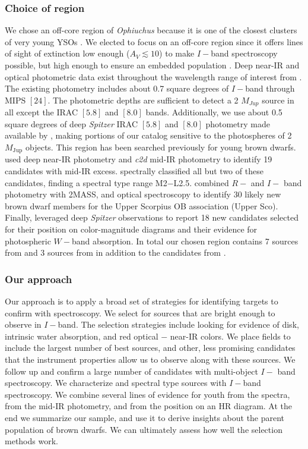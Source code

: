 \subsubsection{Choice of region}
We chose an off-core region of \emph{Ophiuchus} because it is one of the closest clusters of very young YSOs \citep{2008ApJ...675L..29L}.  We elected to focus on an off-core region since it offers lines of sight of extinction low enough ($A_V\lesssim 10$) to make $I-$band spectroscopy possible, but high enough to ensure an embedded population \citep{2008A&A...489..143L}.  Deep near-IR and optical photometric data exist throughout the wavelength range of interest from \citet{allers06}.  The existing \citet{allers06} photometry includes about 0.7 square degrees of $I-$band through MIPS $[24]$.  The photometric depths are sufficient to detect a 2 $M_{Jup}$ source in all except the IRAC $[5.8]$ and $[8.0]$ bands.  Additionally, we use about 0.5 square degrees of deep \emph{Spitzer} IRAC $[5.8]$ and $[8.0]$ photometry made available by \citet{2010ApJ...720.1374H}, making portions of our catalog sensitive to the photospheres of 2 $M_{\mathrm{Jup}}$ objects.  
This region has been searched previously for young brown dwarfs.  \citet{allers06} used deep near-IR photometry and \emph{c2d} mid-IR photometry to identify 19 candidates with mid-IR excess.  \citet{2011ASPC..448..633G} spectrally classified all but two of these candidates, finding a spectral type range M2$-$L2.5.  \citet{2006AJ....131.3016S} combined $R-$ and $I-$ band photometry with 2MASS, and optical spectroscopy to identify 30 likely new brown dwarf members for the Upper Scorpius OB association (Upper Sco).  Finally, \citet{2010ApJ...720.1374H} leveraged deep \emph{Spitzer} observations to report 18 new candidates selected for their position on color-magnitude diagrams and their evidence for photospheric $W-$band absorption.  In total our chosen region contains 7 sources from \citet{allers06} and 3 sources from \citet{2006AJ....131.3016S} in addition to the candidates from \citet{2010ApJ...720.1374H}.  

\subsubsection{Our approach}
Our approach is to apply a broad set of strategies for identifying targets to confirm with spectroscopy.  We select for sources that are bright enough to observe in $I-$band.  The selection strategies include looking for evidence of disk, intrinsic water absorption, and red optical $-$ near-IR colors.    We place fields to include the largest number of best sources, and other, less promising candidates that the instrument properties allow us to observe along with these sources.  We follow up and confirm a large number of candidates with multi-object $I-$ band spectroscopy.  We characterize and spectral type sources with $I-$band spectroscopy.  We combine several lines of evidence for youth from the spectra, from the mid-IR photometry, and from the position on an HR diagram.  At the end we summarize our sample, and use it to derive insights about the parent population of brown dwarfs.  We can ultimately assess how well the selection methods work.

